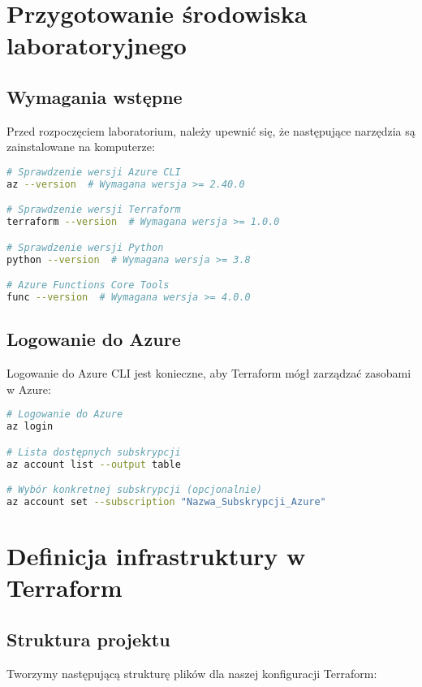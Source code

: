 \documentclass{article}
\begin{document}
\section{Przygotowanie środowiska laboratoryjnego}

\subsection{Wymagania wstępne}

Przed rozpoczęciem laboratorium, należy upewnić się, że następujące narzędzia są zainstalowane na komputerze:

\begin{lstlisting}[language=bash]
# Sprawdzenie wersji Azure CLI
az --version  # Wymagana wersja >= 2.40.0

# Sprawdzenie wersji Terraform
terraform --version  # Wymagana wersja >= 1.0.0

# Sprawdzenie wersji Python
python --version  # Wymagana wersja >= 3.8

# Azure Functions Core Tools
func --version  # Wymagana wersja >= 4.0.0
\end{lstlisting}

\subsection{Logowanie do Azure}

Logowanie do Azure CLI jest konieczne, aby Terraform mógł zarządzać zasobami w Azure:

\begin{lstlisting}[language=bash]
# Logowanie do Azure
az login

# Lista dostępnych subskrypcji
az account list --output table

# Wybór konkretnej subskrypcji (opcjonalnie)
az account set --subscription "Nazwa_Subskrypcji_Azure"
\end{lstlisting}

\section{Definicja infrastruktury w Terraform}

\subsection{Struktura projektu}

Tworzymy następującą strukturę plików dla naszej konfiguracji Terraform:
\end{document}
